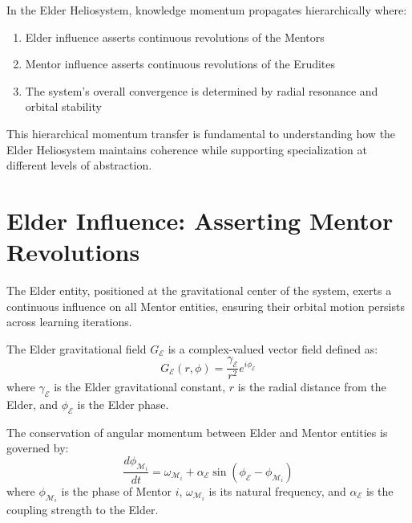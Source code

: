 \begin{theorem}
In the Elder Heliosystem, knowledge momentum propagates hierarchically where:
\begin{enumerate}
    \item Elder influence asserts continuous revolutions of the Mentors
    \item Mentor influence asserts continuous revolutions of the Erudites
    \item The system's overall convergence is determined by radial resonance and orbital stability
\end{enumerate}
\end{theorem}

This hierarchical momentum transfer is fundamental to understanding how the Elder Heliosystem maintains coherence while supporting specialization at different levels of abstraction.

\section{Elder Influence: Asserting Mentor Revolutions}

The Elder entity, positioned at the gravitational center of the system, exerts a continuous influence on all Mentor entities, ensuring their orbital motion persists across learning iterations.

\begin{definition}
The Elder gravitational field $G_{\mathcal{E}}$ is a complex-valued vector field defined as:
\begin{equation}
G_{\mathcal{E}}(r, \phi) = \frac{\gamma_{\mathcal{E}}}{r^2}e^{i\phi_{\mathcal{E}}}
\end{equation}
where $\gamma_{\mathcal{E}}$ is the Elder gravitational constant, $r$ is the radial distance from the Elder, and $\phi_{\mathcal{E}}$ is the Elder phase.
\end{definition}

\begin{proposition}
The conservation of angular momentum between Elder and Mentor entities is governed by:
\begin{equation}
\frac{d\phi_{\mathcal{M}_i}}{dt} = \omega_{\mathcal{M}_i} + \alpha_{\mathcal{E}} \sin(\phi_{\mathcal{E}} - \phi_{\mathcal{M}_i})
\end{equation}
where $\phi_{\mathcal{M}_i}$ is the phase of Mentor $i$, $\omega_{\mathcal{M}_i}$ is its natural frequency, and $\alpha_{\mathcal{E}}$ is the coupling strength to the Elder.
\end{proposition}

